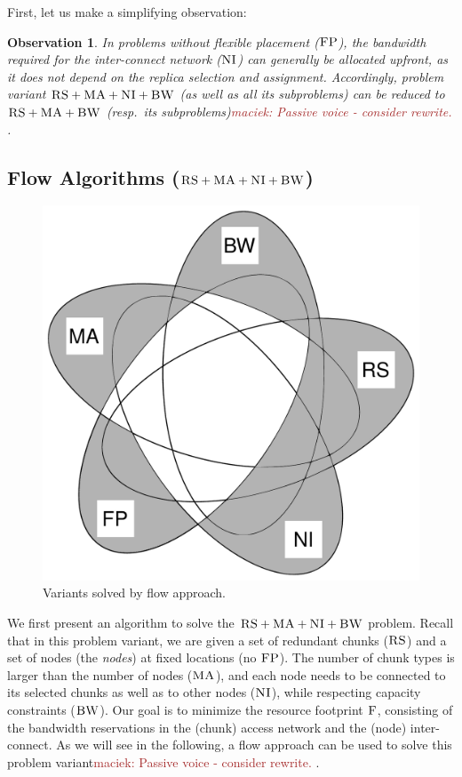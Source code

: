 \documentclass[9pt]{sigcomm-alternate}
\newcommand{\maciek}[1]{\textcolor{brown}{maciek: #1}}
\newcommand{\CC}{\textsc{NI}}
\newcommand{\FP}{\textsc{FP}}
\newcommand{\RS}{\textsc{RS}}
\newcommand{\BW}{\textsc{BW}}
\newcommand{\MA}{\textsc{MA}}
\newcommand{\Cost}{\textsc{F}}
\newtheorem{obs}{Observation}
\newcommand{\CostTrans}{\ensuremath{b_1}}
\newcommand{\CostCom}{\ensuremath{b_2}}
\begin{document}
First, let us make a simplifying observation:
\begin{obs}\label{obs:nofp}
In problems without flexible placement ($\FP$),
the bandwidth required
for the inter-connect network ($\CC$) can generally be allocated \emph{upfront}, as it
does not depend on the replica
selection and assignment.
Accordingly, problem variant $\RS+\MA+\CC +\BW$ (as well as all its subproblems)
can be reduced to $\RS+\MA+\BW$ (resp.~its subproblems)\maciek{Passive voice - consider rewrite.}
.
\end{obs}

\subsection{Flow Algorithms ($\RS+\MA+\CC+\BW$)}\label{ssec:flow}

\begin{figure}
\includegraphics[width=0.48\columnwidth]{figs/venn_flow.pdf}
\caption{Variants solved by flow approach.}
\label{fig:venn_flow}
\end{figure}

We first present an algorithm to solve the $\RS+\MA+\CC+\BW$ problem.
Recall that in this problem variant,
we are given a set of redundant chunks ($\RS$) and a set of nodes
(the \emph{nodes})
at fixed locations (no $\FP$). The number of chunk types is larger than the number
of nodes ($\MA$), and each node needs to be connected
to its selected chunks as well as to other nodes ($\CC$), while respecting
capacity constraints ($\BW$).
Our goal is to minimize the resource footprint $\Cost$, consisting
of the bandwidth reservations in the (chunk) access network and the (node)
inter-connect.
As we will see in the following, a flow approach can be used to solve this
problem variant\maciek{Passive voice - consider rewrite.}
.

\end{document}
